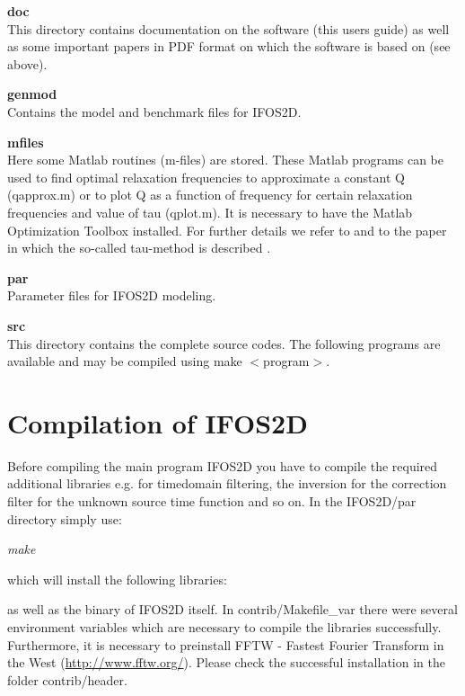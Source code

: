 \textbf{doc}\\
This directory contains documentation on the software (this users guide) as well as some important papers in PDF format on which the software is based on (see above).

\textbf{genmod}\\
Contains the model and benchmark files for IFOS2D.

\textbf{mfiles}\\
Here some Matlab routines (m-files) are stored. These Matlab programs can be used to find optimal relaxation frequencies to approximate a constant Q (qapprox.m) or to plot Q as a function of frequency for certain relaxation frequencies and value of tau (qplot.m). It is necessary to have the Matlab Optimization Toolbox installed. For further details we refer to \cite{bohlen:98} and to the paper in which the so-called tau-method is described \cite{blanch:95}.

\textbf{par}\\
Parameter files for IFOS2D modeling.


\textbf{src}\\
This directory contains the complete source codes.  The following programs are available and may be compiled using make $<$program$>$.


\section{Compilation of IFOS2D}\label{compexec}
Before compiling the main program IFOS2D you have to compile the required additional libraries e.g. for timedomain filtering, the inversion for the correction filter for the unknown source time function and so on. In the IFOS2D/par directory simply use:
\newline

\textit{make}
\newline

which will install the following libraries:

{\color{blue}{\begin{verbatim}
lib cseife
lib stfinv
lib aff
lib fourier
\end{verbatim}}}
as well as the binary of IFOS2D itself.
In contrib/Makefile\_var there were several environment variables which are necessary to compile the libraries successfully. Furthermore, it is necessary to preinstall FFTW - Fastest Fourier Transform in the West (\href{http://www.fftw.org/}{http://www.fftw.org/}). Please check the successful installation in the folder contrib/header.
\newline
  

